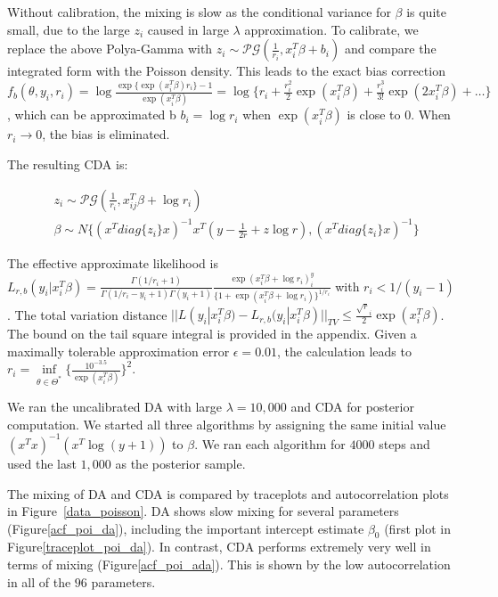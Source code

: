 \documentclass[10pt]{article}
\newcommand{\xbeta}{ x_i^T \beta}
\newcommand{\xbetaij}{ x_{ij}^T \beta}
\begin{document}
Without calibration, the mixing is slow as the conditional variance for $\beta$ is quite small, due to the large $z_i$ caused in large $\lambda$ approximation. To calibrate, we replace the above Polya-Gamma with $z_i \sim \mathcal{PG} ( \frac{1}{r_i}, \xbeta + b_i )$ and compare the integrated form with the Poisson density. This leads to the exact bias correction $f_b(\theta,y_{i},r_{i})= \log \frac{\exp\{\exp(\xbeta)r_i\}-1}{\exp(\xbeta)}= \log \{ r_i+ \frac{r_i^2}{2}\exp(\xbeta)+ \frac{r_i^3}{3!}  \exp(2\xbeta)+\ldots \} $, which can be approximated b  $b_i = \log r_i$ when $\exp(\xbeta)$ is close to $0$. When $r_i\rightarrow 0$, the bias is eliminated.

The resulting CDA is:


\begin{equation}\begin{aligned}
		& z_{i}\sim \mathcal{PG}(\frac{1}{r_{i}}, \xbetaij+ \log r_{i}) \\
	& \beta \sim N\{  (x^T diag\{z_{i}\}x)^{-1}   x^T (y-\frac{1}{2 r} + z \log r)  ,  (x^T diag\{z_{i}\}x)^{-1}   \}
\end{aligned}\end{equation}

The effective approximate likelihood is $L_{r,b} (y_i| \xbeta) =\frac{\Gamma(1/r_i+1)}{\Gamma(1/r_i-y_i+1)\Gamma(y_i+1)}\frac{\exp ( \xbeta+\log r_i)^y_i}{\{1+ \exp ( \xbeta +\log r_i)\}^{1/r_i}}$ with $r_i< 1/(y_i -1)$. The total variation distance $||L (y_i| \xbeta) - L_{r,b} (y_i| \xbeta)||_{TV}\le \frac{\sqrt r_i }{2}\exp (\xbeta)$. The bound on the tail square integral is provided in the appendix. Given a maximally tolerable approximation error $\epsilon=0.01$, the calculation leads to  $r_{i} = \underset{\theta \in \varTheta^*}{\inf}  \{\frac{10^{-3.5} }{\exp(\xbeta)}\}^2   $.

We ran the uncalibrated DA with large $\lambda=10,000$ and CDA for posterior computation. We started all three algorithms by assigning the same initial value $(x^Tx)^{-1}(x^T \log( y+1))$ to ${\beta}$. We ran each algorithm for $4000$ steps and used the last $1,000$ as the posterior sample.

The mixing of DA and CDA is compared by traceplots and autocorrelation plots in Figure~\ref{data_poisson}. DA shows slow mixing for several parameters (Figure\ref{acf_poi_da}), including the important intercept estimate $\beta_0$ (first plot in Figure\ref{traceplot_poi_da}). In contrast, CDA performs extremely very well in terms of mixing (Figure\ref{acf_poi_ada}). This is shown by the low autocorrelation in all of the $96$ parameters. 
\end{document}

